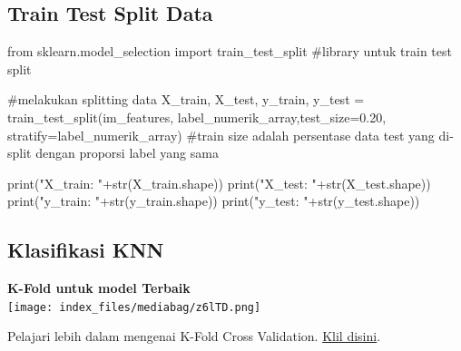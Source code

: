 \documentclass[
  letterpaper,
  DIV=11,
  numbers=noendperiod]{scrreprt}
\newenvironment{Shaded}{\begin{snugshade}}{\end{snugshade}}
\newcommand{\BuiltInTok}[1]{\textcolor[rgb]{0.00,0.23,0.31}{#1}}
\newcommand{\CommentTok}[1]{\textcolor[rgb]{0.37,0.37,0.37}{#1}}
\newcommand{\FloatTok}[1]{\textcolor[rgb]{0.68,0.00,0.00}{#1}}
\newcommand{\ImportTok}[1]{\textcolor[rgb]{0.00,0.46,0.62}{#1}}
\newcommand{\NormalTok}[1]{\textcolor[rgb]{0.00,0.23,0.31}{#1}}
\newcommand{\OperatorTok}[1]{\textcolor[rgb]{0.37,0.37,0.37}{#1}}
\newcommand{\StringTok}[1]{\textcolor[rgb]{0.13,0.47,0.30}{#1}}
\begin{document}
\hypertarget{train-test-split-data-3}{%
\subsection*{Train Test Split Data}\label{train-test-split-data-3}}

\begin{Shaded}
\begin{Highlighting}[]
\ImportTok{from}\NormalTok{ sklearn.model\_selection }\ImportTok{import}\NormalTok{ train\_test\_split }\CommentTok{\#library untuk train test split}

\CommentTok{\#melakukan splitting data}
\NormalTok{X\_train, X\_test, y\_train, y\_test }\OperatorTok{=}\NormalTok{ train\_test\_split(im\_features, label\_numerik\_array,test\_size}\OperatorTok{=}\FloatTok{0.20}\NormalTok{, stratify}\OperatorTok{=}\NormalTok{label\_numerik\_array) }
\CommentTok{\#train size adalah persentase data test yang di{-}split dengan proporsi label yang sama}

\BuiltInTok{print}\NormalTok{(}\StringTok{"X\_train: "}\OperatorTok{+}\BuiltInTok{str}\NormalTok{(X\_train.shape))}
\BuiltInTok{print}\NormalTok{(}\StringTok{"X\_test: "}\OperatorTok{+}\BuiltInTok{str}\NormalTok{(X\_test.shape))}
\BuiltInTok{print}\NormalTok{(}\StringTok{"y\_train: "}\OperatorTok{+}\BuiltInTok{str}\NormalTok{(y\_train.shape))}
\BuiltInTok{print}\NormalTok{(}\StringTok{"y\_test: "}\OperatorTok{+}\BuiltInTok{str}\NormalTok{(y\_test.shape))}
\end{Highlighting}
\end{Shaded}

\hypertarget{klasifikasi-knn-3}{%
\subsection*{Klasifikasi KNN}\label{klasifikasi-knn-3}}

\textbf{K-Fold untuk model Terbaik}\\

\texttt{[image: index\_files/mediabag/z6lTD.png]}

\begin{tcolorbox}[enhanced jigsaw, opacityback=0, colbacktitle=quarto-callout-tip-color!10!white, breakable, titlerule=0mm, left=2mm, toptitle=1mm, rightrule=.15mm, leftrule=.75mm, colback=white, opacitybacktitle=0.6, arc=.35mm, toprule=.15mm, coltitle=black, colframe=quarto-callout-tip-color-frame, bottomtitle=1mm, title=\textcolor{quarto-callout-tip-color}{\faLightbulb}\hspace{0.5em}{Tip}, bottomrule=.15mm]

Pelajari lebih dalam mengenai K-Fold Cross Validation.
\href{https://www.geeksforgeeks.org/stratified-k-fold-cross-validation/}{Klil
disini}.

\end{tcolorbox}
\end{document}
